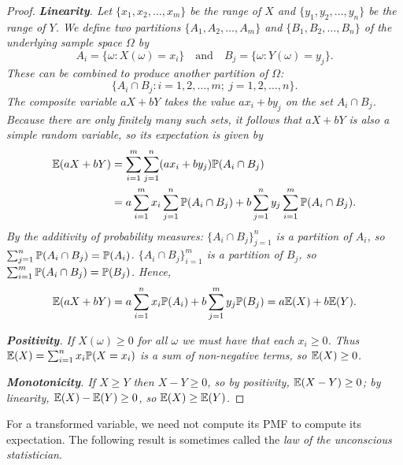 \begin{proof}
\ben
\it %
\textbf{Linearity}. Let $\{x_1,x_2,\ldots,x_m\}$ be the range of $X$ and $\{y_1,y_2,\ldots,y_n\}$ be the range of $Y$. We define two partitions $\{A_1,A_2,\ldots,A_m\}$ and $\{B_1,B_2,\ldots,B_n\}$ of the underlying sample space $\Omega$ by
\[
A_i = \{\omega:X(\omega)=x_i\} \quad\text{and}\quad B_j = \{\omega:Y(\omega)=y_j\}.
\]
These can be combined to produce another partition of $\Omega$:
\[
\{A_i\cap B_j: i=1,2,\ldots,m;\ j=1,2,\ldots,n\}.
\]
The composite variable $aX + bY$ takes the value $ax_i+by_j$ on the set $A_i\cap B_j$. Because there are only finitely many such sets, it follows that $aX+bY$ is also a simple random variable, so its expectation is given by
\begin{align*}
\mathbb{E}(aX+bY)
	& = \sum_{i=1}^m\sum_{j=1}^n (ax_i + by_j) \mathbb{P}(A_i\cap B_j) \\
	& = a\sum_{i=1}^m x_i \sum_{j=1}^n \mathbb{P}(A_i\cap B_j) + b\sum_{j=1}^n y_j \sum_{i=1}^m \mathbb{P}(A_i\cap B_j).
\end{align*}
By the additivity of probability measures:
\bit
\it $\{A_i\cap B_j\}_{j=1}^n$ is a partition of $A_i$, so $\sum_{j=1}^n \mathbb{P}(A_i\cap B_j) = \mathbb{P}(A_i)$.
\it $\{A_i\cap B_j\}_{i=1}^m$ is a partition of $B_j$, so $\sum_{i=1}^m \mathbb{P}(A_i\cap B_j) = \mathbb{P}(B_j)$.
\eit
Hence,
\[
\mathbb{E}(aX+bY)
	= a\sum_{i=1}^n x_i\mathbb{P}(A_i) + b\sum_{j=1}^m y_j\mathbb{P}(B_j)
	= a\mathbb{E}(X) + b\mathbb{E}(Y).
\]

\it %
\textbf{Positivity}. If $X(\omega)\geq 0$ for all $\omega$ we must have that each $x_i\geq 0$. Thus $\mathbb{E}(X) = \sum_{i=1}^n x_i \mathbb{P}(X=x_i)$ is a sum of non-negative terms, so $\mathbb{E}(X)\geq 0$.

\it %
\textbf{Monotonicity}. If $X\geq Y$ then $X-Y\geq 0$, so
\bit
\it by positivity, $\mathbb{E}(X-Y)\geq 0$;
\it by linearity, $\mathbb{E}(X)-\mathbb{E}(Y)\geq 0$, so $\mathbb{E}(X)\geq\mathbb{E}(Y)$.
\eit
\een
\end{proof}

For a transformed variable, we need not compute its PMF to compute its expectation. The following result is sometimes called the \emph{law of the unconscious statistician}.

